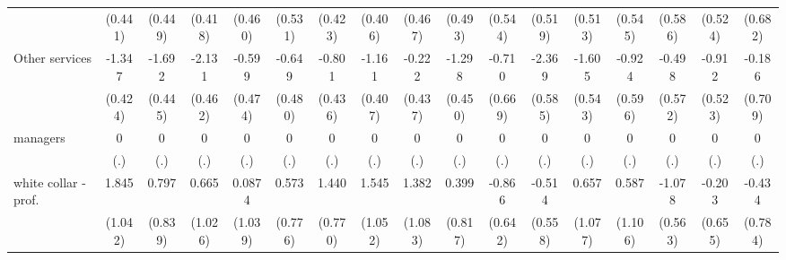 {\begin{tabular}{l*{16}{c}}
                    &     (0.441)         &     (0.449)         &     (0.418)         &     (0.460)         &     (0.531)         &     (0.423)         &     (0.406)         &     (0.467)         &     (0.493)         &     (0.544)         &     (0.519)         &     (0.513)         &     (0.545)         &     (0.586)         &     (0.524)         &     (0.682)         \\
[1em]
Other services      &      -1.347\sym{**} &      -1.692\sym{***}&      -2.131\sym{***}&      -0.599         &      -0.649         &      -0.801         &      -1.161\sym{**} &      -0.222         &      -1.298\sym{**} &      -0.710         &      -2.369\sym{***}&      -1.605\sym{**} &      -0.924         &      -0.498         &      -0.912         &      -0.186         \\
                    &     (0.424)         &     (0.445)         &     (0.462)         &     (0.474)         &     (0.480)         &     (0.436)         &     (0.407)         &     (0.437)         &     (0.450)         &     (0.669)         &     (0.585)         &     (0.543)         &     (0.596)         &     (0.572)         &     (0.523)         &     (0.709)         \\
[1em]
managers            &           0         &           0         &           0         &           0         &           0         &           0         &           0         &           0         &           0         &           0         &           0         &           0         &           0         &           0         &           0         &           0         \\
                    &         (.)         &         (.)         &         (.)         &         (.)         &         (.)         &         (.)         &         (.)         &         (.)         &         (.)         &         (.)         &         (.)         &         (.)         &         (.)         &         (.)         &         (.)         &         (.)         \\
[1em]
white collar - prof.&       1.845         &       0.797         &       0.665         &      0.0874         &       0.573         &       1.440         &       1.545         &       1.382         &       0.399         &      -0.866         &      -0.514         &       0.657         &       0.587         &      -1.078         &      -0.203         &      -0.434         \\
                    &     (1.042)         &     (0.839)         &     (1.026)         &     (1.039)         &     (0.776)         &     (0.770)         &     (1.052)         &     (1.083)         &     (0.817)         &     (0.642)         &     (0.558)         &     (1.077)         &     (1.106)         &     (0.563)         &     (0.655)         &     (0.784)         \\

\end{tabular}}
